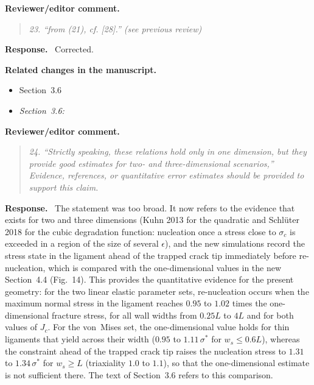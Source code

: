 \documentclass[pdflatex,sn-mathphys-num]{sn-jnl}
\newenvironment{reviewercomment}
  {\par\noindent\textbf{Reviewer/editor comment.}\begin{quote}\itshape}
  {\end{quote}}
\newenvironment{response}
  {\par\noindent\textbf{Response.}\ }
  {\par}
\newenvironment{relatedchanges}
  {\par\noindent\textbf{Related changes in the manuscript.}\begin{itemize}\small}
  {\end{itemize}}
\newcommand{\msloc}[1]{\textit{#1:}\ }
\newcommand{\relhead}[1]{\item[]\vspace*{0.2\baselineskip}#1}
\begin{document}
\begin{reviewercomment}
23. ``from (21), cf. [28].'' (see previous review)
\end{reviewercomment}
\begin{response}
Corrected.
\end{response}
\begin{relatedchanges}
\relhead{Section~3.6}
\item \msloc{Section~3.6}
\end{relatedchanges}

\begin{reviewercomment}
24. ``Strictly speaking, these relations hold only in one dimension, but they provide good estimates for two- and
three-dimensional scenarios,'' Evidence, references, or quantitative error estimates should be provided to support this
claim.
\end{reviewercomment}
\begin{response}
The statement was too broad. It now refers to the evidence that exists for two and three dimensions (Kuhn 2013 for the quadratic and Schl\"uter 2018 for the cubic degradation function: nucleation once a stress close to $\sigma_c$ is exceeded in a region of the size of several $\epsilon$), and the new simulations record the stress state in the ligament ahead of the trapped crack tip immediately before re-nucleation, which is compared with the one-dimensional values in the new Section~4.4 (Fig.~14). This provides the quantitative evidence for the present geometry: for the two linear elastic parameter sets, re-nucleation occurs when the maximum normal stress in the ligament reaches $0.95$ to $1.02$ times the one-dimensional fracture stress, for all wall widths from $0.25L$ to $4L$ and for both values of $J_c$. For the von~Mises set, the one-dimensional value holds for thin ligaments that yield across their width ($0.95$ to $1.11\,\sigma^*$ for $w_s \le 0.6L$), whereas the constraint ahead of the trapped crack tip raises the nucleation stress to $1.31$ to $1.34\,\sigma^*$ for $w_s \ge L$ (triaxiality $1.0$ to $1.1$), so that the one-dimensional estimate is not sufficient there. The text of Section~3.6 refers to this comparison.
\end{response}
\end{document}
